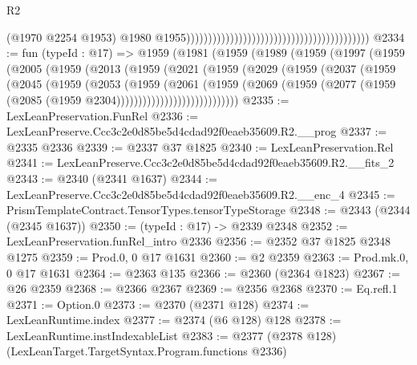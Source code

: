 \begin{lexlean}{R2}
\begin{coremodule}
                                                                                        (@1970
                                                                                          @2254
                                                                                          @1953)
                                                                                        @1980
                                                                                        @1955))))))))))))))))))))))))))))))))))))))))))
@2334 := fun (typeId : @17) =>
  @1959
    (@1981
      (@1959
        (@1989
          (@1959
            (@1997
              (@1959
                (@2005
                  (@1959
                    (@2013
                      (@1959
                        (@2021
                          (@1959
                            (@2029
                              (@1959
                                (@2037
                                  (@1959
                                    (@2045
                                      (@1959
                                        (@2053
                                          (@1959
                                            (@2061
                                              (@1959
                                                (@2069
                                                  (@1959
                                                    (@2077
                                                      (@1959
                                                        (@2085
                                                          (@1959 @2304))))))))))))))))))))))))))))
@2335 := LexLeanPreservation.FunRel
@2336 := LexLeanPreserve.Ccc3c2e0d85be5d4cdad92f0eaeb35609.R2.__prog
@2337 := @2335 @2336
@2339 := @2337 @37 @1825
@2340 := LexLeanPreservation.Rel
@2341 := LexLeanPreserve.Ccc3c2e0d85be5d4cdad92f0eaeb35609.R2.__fits_2
@2343 := @2340 (@2341 @1637)
@2344 := LexLeanPreserve.Ccc3c2e0d85be5d4cdad92f0eaeb35609.R2.__enc_4
@2345 := PrismTemplateContract.TensorTypes.tensorTypeStorage
@2348 := @2343 (@2344 (@2345 @1637))
@2350 := (typeId : @17) -> @2339 @2348
@2352 := LexLeanPreservation.funRel_intro @2336
@2356 := @2352 @37 @1825 @2348 @1275
@2359 := Prod.{0, 0} @17 @1631
@2360 := @2 @2359
@2363 := Prod.mk.{0, 0} @17 @1631
@2364 := @2363 @135
@2366 := @2360 (@2364 @1823)
@2367 := @26 @2359
@2368 := @2366 @2367
@2369 := @2356 @2368
@2370 := Eq.refl.{1}
@2371 := Option.{0}
@2373 := @2370 (@2371 @128)
@2374 := LexLeanRuntime.index
@2377 := @2374 (@6 @128) @128
@2378 := LexLeanRuntime.instIndexableList
@2383 := @2377 (@2378 @128) (LexLeanTarget.TargetSyntax.Program.functions @2336)

\end{coremodule}
\end{lexlean}
